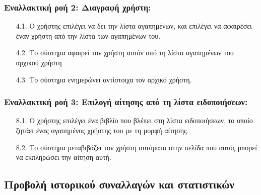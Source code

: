 \documentclass[12pt,a4paper]{article}
\begin{document}
\subsubsection*{Εναλλακτική ροή 2: Διαγραφή χρήστη:}
\begin{enumerate}
    \item [4.1.] Ο χρήστης επιλέγει να δει την λίστα αγαπημένων, και επιλέγει να αφαιρέσει έναν χρήστη από την λίστα των αγαπημένων του.
    \item [4.2.] Το σύστημα αφαιρεί τον χρήστη αυτόν από τη λίστα αγαπημένων του αρχικού χρήστη
    \item [4.3.] Το σύστημα ενημερώνει αντίστοιχα τον αρχικό χρήστη.
\end{enumerate}

\subsubsection*{Εναλλακτική ροή 3: Επιλογή αίτησης από τη λίστα ειδοποιήσεων:}
\begin{enumerate}
    \item [8.1.] Ο χρήστης επιλέγει ένα βιβλίο που βλέπει στη λίστα ειδοποιήσεων, το οποίο ζητάει ένας αγαπημένος χρήστης του με τη μορφή αίτησης.
    \item [8.2.] Το σύστημα μεταβιβάζει τον χρήστη αυτόματα στην σελίδα που αυτός μπορεί να εκπληρώσει την αίτηση αυτή.
\end{enumerate}

\subsection{Προβολή ιστορικού συναλλαγών και στατιστικών}
\end{document}
